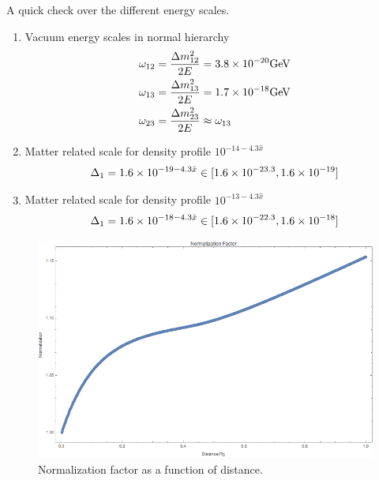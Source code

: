 \documentclass[letterpaper,12pt,english]{sphinxmanual}
\begin{document}
A quick check over the different energy scales.
\begin{enumerate}
\item {} 
Vacuum energy scales in normal hierarchy
\begin{gather}
\begin{split}\omega_{12}&= \frac{\Delta m_{12}^2}{2E} = 3.8\times 10^{-20}\mathrm{GeV}\\
\omega_{13}&= \frac{\Delta m_{13}^2}{2E} = 1.7\times 10^{-18}\mathrm{GeV}\\
\omega_{23}&= \frac{\Delta m_{23}^2}{2E} \approx \omega_{13}\end{split}\notag
\end{gather}
\item {} 
Matter related scale for density profile \(10^{-14-4.3\hat x}\)
\begin{gather}
\begin{split}\Delta_1 = 1.6\times 10^{-19-4.3\hat x}\in [1.6\times 10^{-23.3},1.6\times 10^{-19}]\end{split}\notag
\end{gather}
\item {} 
Matter related scale for density profile \(10^{-13-4.3\hat x}\)
\begin{gather}
\begin{split}\Delta_1 = 1.6\times 10^{-18-4.3\hat x}\in [1.6\times 10^{-22.3},1.6\times 10^{-18}]\end{split}\notag
\end{gather}
\end{enumerate}
\begin{figure}[htbp]
\centering
\capstart

\includegraphics{numericalMSW3Flavor-normalization.png}
\caption{Normalization factor as a function of distance.}\end{figure}
\end{document}
